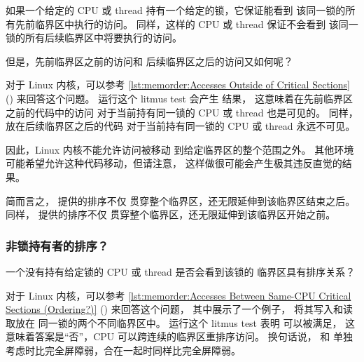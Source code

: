 如果一个给定的 CPU 或 thread 持有一个给定的锁，它保证能看到
该同一锁的所有先前临界区中执行的访问。
同样，这样的 CPU 或 thread 保证不会看到
该同一锁的所有后续临界区中将要执行的访问。

\begin{listing}

\caption{临界区外的访问}
\label{lst:memorder:Accesses Outside of Critical Sections}
\end{listing}

但是，先前临界区之前的访问和
后续临界区之后的访问又如何呢？

对于 Linux 内核，可以参考
\cref{lst:memorder:Accesses Outside of Critical Sections}
() 来回答这个问题。
运行这个 litmus test 会产生  结果，
这意味着在先前临界区之前的代码中的访问
对于当前持有同一锁的 CPU 或 thread 也是可见的。
同样，放在后续临界区之后的代码
对于当前持有同一锁的 CPU 或 thread 永远不可见。

因此，Linux 内核不能允许访问被移动
到给定临界区的整个范围之外。
其他环境可能希望允许这种代码移动，但请注意，
这样做很可能会产生极其违反直觉的结果。

简而言之， 提供的排序不仅
贯穿整个临界区，还无限延伸到该临界区结束之后。
同样， 提供的排序不仅
贯穿整个临界区，还无限延伸到该临界区开始之前。

\subsubsection{非锁持有者的排序？}
\label{sec:memorder:Ordering for Non-Lock Holders?}

一个没有持有给定锁的 CPU 或 thread 是否会看到该锁的
临界区具有排序关系？

\begin{listing}

\caption{同一CPU临界区之间的访问（有排序吗？）}
\label{lst:memorder:Accesses Between Same-CPU Critical Sections (Ordering?)}
\end{listing}

对于 Linux 内核，可以参考
\cref{lst:memorder:Accesses Between Same-CPU Critical Sections (Ordering?)}
() 来回答这个问题，
其中展示了一个例子， 将其写入和读取放在
同一锁的两个不同临界区中。
运行这个 litmus test 表明  可以被满足，
这意味着答案是“否”，CPU 可以跨连续的临界区重排序访问。
换句话说， 和 
单独考虑时比完全屏障弱，合在一起时同样比完全屏障弱。

